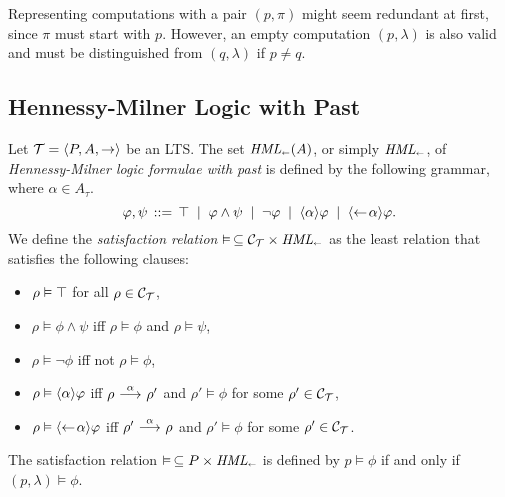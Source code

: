 \begin{remark}
    Representing computations with a pair $(p,\pi)$ might seem redundant at
    first, since $\pi$ must start with $p$. However, an empty computation
    $(p,\lambda)$ is also valid and must be distinguished from $(q,\lambda)$
    if $p\ne q$.
\end{remark}

\subsection{Hennessy-Milner Logic with Past}


\begin{definition}
    Let $\mathcal{T}=\langle P,A,\rightarrow \rangle$ be an LTS. The set $\textit{HML}_\shortleftarrow(A)$,
    or simply $\textit{HML}_\shortleftarrow$, of
    \emph{Hennessy-Milner logic formulae with past} is defined by the following grammar,
    where $\alpha\in A_\tau$.
    \[
        \varphi,\psi \,::=\, \top \;\;|\;\; \varphi\land\psi
                                \;\;|\;\; \neg\varphi
                                \;\;|\;\; \mbox{\ensuremath{\langle \alpha \rangle}} \varphi
                                \;\;|\;\; \mbox{\ensuremath{\langle\leftarrow\! \alpha \rangle}} \varphi.
    \]
    We define the \emph{satisfaction relation} $\vDash\,\subseteq \mathcal{C}_{\mathcal{T}} \times \textit{HML}_\shortleftarrow$
    as the least relation that satisfies the following clauses:
    \begin{itemize}
        \item $\rho\vDash\top$ for all $\rho\in\mathcal{C}_{\mathcal{T}}$,
        \item $\rho\vDash\phi\land\psi$ iff $\rho\vDash\phi$ and $\rho\vDash\psi$,
        \item $\rho\vDash\neg\phi$ iff not $\rho\vDash\phi$,
        \item $\rho\vDash\mbox{\ensuremath{\langle \alpha \rangle}}\varphi$ iff
              $\rho\ {\stackrel{{\alpha}}{\longrightarrow}}\ \rho'$ and $\rho'\vDash\phi$ for some $\rho'\in\mathcal{C}_{\mathcal{T}}$,
        \item $\rho\vDash\mbox{\ensuremath{\langle\leftarrow\! \alpha \rangle}}\varphi$ iff
              $\rho'\ {\stackrel{{\alpha}}{\longrightarrow}}\ \rho$ and $\rho'\vDash\phi$ for some $\rho'\in\mathcal{C}_{\mathcal{T}}$.
    \end{itemize}
    The satisfaction relation $\vDash\,\subseteq P\times\textit{HML}_\shortleftarrow$ is defined by
    $p\vDash\phi$ if and only if $(p,\lambda)\vDash \phi$.
\end{definition}

